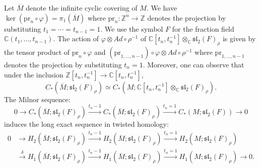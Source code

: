 \documentclass[a4paper]{amsart}
\theoremstyle{plain}
\theoremstyle{definition}
\theoremstyle{remark}
\newcommand{\ZZ}{{\mathbb Z}}
\newcommand{\CC}{{\mathbb C}}
\newcommand{\msll}[1]{\mathfrak{sl}_2(#1)}
\newcommand{\otAd}[2]{#1 \otimes Ad \circ #2}
\newcommand{\infcover}[1]{\overline{#1}}
\begin{document}
Let $\infcover{M}$ denote the infinite cyclic covering of $M$.
We have $\ker (\mathrm{pr}_n \circ \varphi) = \pi_1(\infcover{M})$ where
$\mathrm{pr}_n \colon \ZZ^n \to \ZZ$ denotes the projection by substituting $t_1 = \cdots = t_{n-1} = 1$.
We use the symbol $F$ for the fraction field $\CC(t_1, \ldots, t_{n-1})$.
The action of
$\otAd{\varphi}{\rho^{-1}}$ of $\CC[t_n, t_n^{-1}] \otimes_{\CC} \msll{F}_\rho$
is given by the tensor product of $\mathrm{pr}_n \circ \varphi$ and
$\otAd{(\mathrm{pr}_{1, \ldots, n-1}) \circ \varphi}{\rho^{-1}}$
where $\mathrm{pr}_{1, \ldots, n-1}$ denotes the projection by substituting $t_n = 1$.
Moreover, one can observe that under the inclusion $\ZZ[t_n, t_n^{-1}] \to \CC[t_n, t_n^{-1}]$,
$$
C_*(\infcover{M}; \msll{F}_\rho) \simeq 
C_*(M; \CC[t_n, t_n^{-1}] \otimes_\CC \msll{F}_\rho).
$$ 
The Milnor sequence:
\begin{equation}\label{eqn:MilnorSq}
    0 \to
    C_*(\infcover{M}; \msll{F}_\rho) \xrightarrow{t_n - 1} 
    C_*(\infcover{M}; \msll{F}_\rho) \xrightarrow{t_n = 1} 
    C_*(M; \msll{F}) \to
    0
\end{equation}
 induces the
long exact sequence in twisted homology:
\begin{align}\label{eqn:MilnorSq2}
    0 &\to 
    H_2(\infcover{M}; \msll{F}_\rho) \xrightarrow{t_n - 1} 
    H_2(\infcover{M}; \msll{F}_\rho) \xrightarrow{t_n = 1} 
    H_2(M; \msll{F}_\rho)  \\
    & \xrightarrow{\delta} 
    H_1(\infcover{M}; \msll{F}_\rho) \xrightarrow{t_n - 1}  
    H_1(\infcover{M}; \msll{F}_\rho) \xrightarrow{t_n = 1} 
    H_1(M; \msll{F}_\rho)  \to
    0. \nonumber
\end{align}
\end{document}
